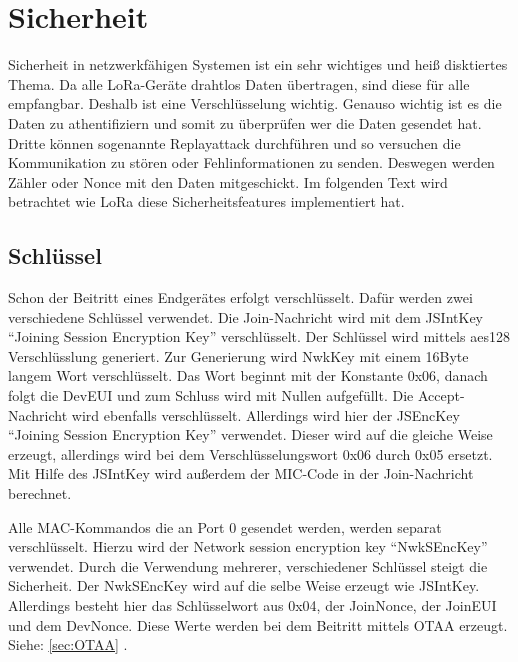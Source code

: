 \documentclass[a4paper, 12pt]{article}
\begin{document}
    \section{Sicherheit} \label{sec:Sicherheit}  
        Sicherheit in netzwerkfähigen Systemen ist ein sehr wichtiges und heiß disktiertes Thema. Da alle LoRa-Geräte 
        drahtlos Daten übertragen, sind diese für alle empfangbar. Deshalb ist eine Verschlüsselung wichtig.
        Genauso wichtig ist es die Daten zu athentifiziern und somit zu überprüfen wer die Daten gesendet hat. 
        Dritte können sogenannte Replayattack durchführen und so versuchen die Kommunikation zu stören oder 
        Fehlinformationen zu senden. Deswegen werden Zähler oder Nonce mit den Daten mitgeschickt. 
        Im folgenden Text wird betrachtet wie LoRa diese Sicherheitsfeatures implementiert hat.

        \subsection{Schlüssel}
            Schon der Beitritt eines Endgerätes erfolgt verschlüsselt. Dafür werden zwei verschiedene Schlüssel 
            verwendet. Die Join-Nachricht wird mit dem JSIntKey ``Joining Session Encryption Key'' verschlüsselt. Der 
            Schlüssel wird mittels aes128 Verschlüsslung generiert. 
            Zur Generierung wird NwkKey mit einem 16Byte langem Wort verschlüsselt. Das Wort beginnt 
            mit der Konstante 0x06, danach folgt die DevEUI und zum Schluss wird mit Nullen aufgefüllt. 
            Die Accept-Nachricht wird ebenfalls verschlüsselt. Allerdings wird 
            hier der JSEncKey ``Joining Session Encryption Key'' verwendet. Dieser wird auf die gleiche Weise erzeugt, 
            allerdings wird bei dem Verschlüsselungswort 0x06 durch 0x05 ersetzt. 
            Mit Hilfe des JSIntKey wird außerdem der MIC-Code in der Join-Nachricht berechnet.

            Alle MAC-Kommandos die an Port 0 gesendet werden, werden separat verschlüsselt. 
            Hierzu wird der Network session encryption key ``NwkSEncKey'' verwendet. 
            Durch die Verwendung mehrerer, verschiedener Schlüssel steigt die Sicherheit. 
            Der NwkSEncKey wird auf die selbe Weise erzeugt wie JSIntKey. Allerdings besteht hier das Schlüsselwort 
            aus 0x04, der JoinNonce, der JoinEUI und dem DevNonce. Diese Werte werden bei dem Beitritt mittels OTAA 
            erzeugt. Siehe: \ref{sec:OTAA} .
\end{document}
